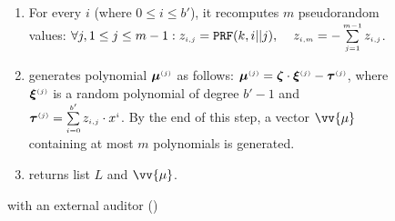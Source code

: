\begin{figure}[ht]
\begin{center}
\begin{tcolorbox}[enhanced,width=5.5in, 
    drop fuzzy shadow southwest,
    colframe=black,colback=white]
{{\begin{enumerate}
\begin{enumerate}
\item\label{ZSPA-A::gen-z} For every $i$ (where $0\leq i \leq b'$), it recomputes $m$ pseudorandom values: 
%
$\forall j, 1\leq j \leq m-1: z_{\scriptscriptstyle i,j}=\mathtt{PRF}(k,i||j), \hspace{4mm} z_{\scriptscriptstyle i,m}=-\sum\limits^{\scriptscriptstyle m-1}_{\scriptscriptstyle j=1}z_{\scriptscriptstyle i,j}$.
%
 \item generates polynomial $\bm\mu^{\scriptscriptstyle (j)}$ as follows: 
   $\bm\mu^{\scriptscriptstyle (j)} = \bm\zeta\cdot \bm\xi^{\scriptscriptstyle (j)}-\bm\tau^{\scriptscriptstyle (j)}$, 
    where $\bm\xi^{\scriptscriptstyle (j)}$ is a random polynomial of degree $b'-1$ and $\bm\tau^{\scriptscriptstyle (j)}=\sum\limits^{\scriptscriptstyle b'}_{\scriptscriptstyle i=0}z_{\scriptscriptstyle i,j}\cdot x^{\scriptscriptstyle i}$. By the end of this step, a vector $\vv{{\mu}}$ containing at most $m$ polynomials is generated. 
%
 \item returns   list $L$ and $\vv{{\mu}}$.
 
\end{enumerate}
 \end{enumerate}
}}
 \end{tcolorbox}
\end{center}
\caption{\zspa with an external auditor (\zspaa)} 
\label{fig:arbiter}
\end{figure}



